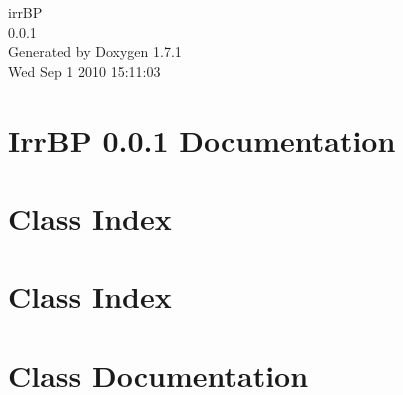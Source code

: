 \documentclass[a4paper]{book}
\begin{document}
\hypersetup{pageanchor=false}
\begin{titlepage}
\vspace*{7cm}
\begin{center}
{\Large irrBP \\[1ex]\large 0.0.1 }\\
\vspace*{1cm}
{\large Generated by Doxygen 1.7.1}\\
\vspace*{0.5cm}
{\small Wed Sep 1 2010 15:11:03}\\
\end{center}
\end{titlepage}
\clearemptydoublepage
{}
\tableofcontents
\clearemptydoublepage
{}
\hypersetup{pageanchor=true}
\chapter{IrrBP 0.0.1 Documentation}
\label{index}\hypertarget{index}{}
\chapter{Class Index}

\chapter{Class Index}

\chapter{Class Documentation}

















\printindex
\end{document}
